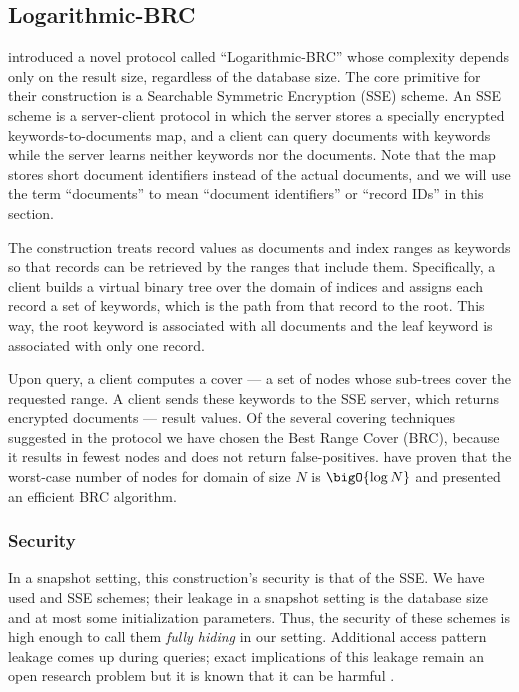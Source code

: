 \subsection{Logarithmic-BRC}

	\textcite{practical-range-search} introduced a novel protocol called ``Logarithmic-BRC'' whose {\IO} complexity depends only on the result size, regardless of the database size.
	The core primitive for their construction is a Searchable Symmetric Encryption (SSE) scheme.
	An SSE scheme is a server-client protocol in which the server stores a specially encrypted keywords-to-documents map, and a client can query documents with keywords while the server
	learns neither keywords nor the documents.
	Note that the map stores short document identifiers instead of the actual documents, and we will use the term ``documents'' to mean ``document identifiers'' or ``record IDs'' in this section.

	The construction treats record values as documents and index ranges as keywords so that records can be retrieved by the ranges that include them.
	Specifically, a client builds a virtual binary tree over the domain of indices and assigns each record a set of keywords, which is the path from that record to the root.
	This way, the root keyword is associated with all documents and the leaf keyword is associated with only one record.

	Upon query, a client computes a cover --- a set of nodes whose sub-trees cover the requested range.
	A client sends these keywords to the SSE server, which returns encrypted documents --- result values.
	Of the several covering techniques suggested in the protocol \cite{practical-range-search} we have chosen the Best Range Cover (BRC), because it results in fewest nodes and does not return false-positives.
	\textcite{brc} have proven that the worst-case number of nodes for domain of size $N$ is $\bigO{\log N}$ and presented an efficient BRC algorithm.

	\subsubsection{Security}
		In a snapshot setting, this construction's security is that of the SSE\@.
		We have used \cite{cjjkrs-13} and \cite{cjjjkrs-14} SSE schemes; their leakage in a snapshot setting is the database size and at most some initialization parameters.
		Thus, the security of these schemes is high enough to call them \emph{fully hiding} in our setting.
		Additional access pattern leakage comes up during queries; exact implications of this leakage remain an open research problem but it is known that it can be harmful \cite{generic-attacks-kellaris}.

